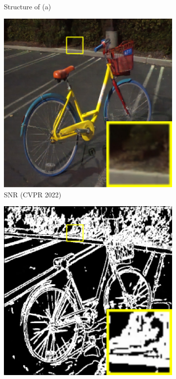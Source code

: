 \documentclass[a4paper]{ctexart}
\begin{document}
\begin{figure}[htb]
\begin{subfigure}{0.25\columnwidth}
			\captionsetup{font=scriptsize}
			\caption{Structure of (a)}
			\label{fig: Structure of (a)}	
		\end{subfigure}
		\begin{subfigure}{0.25\columnwidth}
			\includegraphics[width=\linewidth]{picture/LLIE/Structure Modeling and Guidance/SNR (CVPR 2022)}
			\captionsetup{font=scriptsize}
			\caption{SNR (CVPR 2022)}
			\label{fig: SNR (CVPR 2022)}	
		\end{subfigure}
		\begin{subfigure}{0.25\columnwidth}
			\includegraphics[width=\linewidth]{picture/LLIE/Structure Modeling and Guidance/Structure Modeling}

\end{subfigure}
\end{figure}
\end{document}
